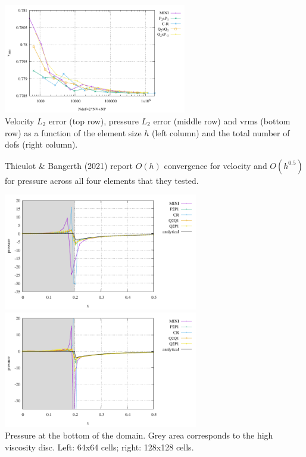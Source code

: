 \begin{center}
\includegraphics[width=8cm]{python_codes/fieldstone_112/results/exp5/vrms_ndof.pdf}\\
{\captionfont Velocity $L_2$ error (top row), pressure $L_2$ error (middle row) and vrms (bottom row) 
as a function of the element size $h$ (left column) and the total number of dofs (right column).}
\end{center}

Thieulot \& Bangerth (2021) \cite{thba21} report $O(h)$ convergence for 
velocity and $O(h^{0.5})$ for pressure across all four elements that they tested.


\begin{center}
\includegraphics[width=8.5cm]{python_codes/fieldstone_112/results/exp5/bottom64}
\includegraphics[width=8.5cm]{python_codes/fieldstone_112/results/exp5/bottom128}\\
{\captionfont Pressure at the bottom of the domain. Grey area corresponds to the 
high viscosity disc. Left: 64x64 cells; right: 128x128 cells.}
\end{center}




